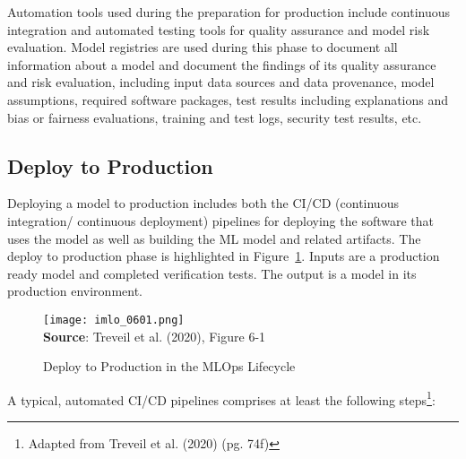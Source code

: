Automation tools used during the preparation for production include continuous integration and automated testing tools for quality assurance and model risk evaluation. Model registries are used during this phase to document all information about a model and document the findings of its quality assurance and risk evaluation, including input data sources and data provenance, model assumptions, required software packages, test results including explanations and bias or fairness evaluations, training and test logs, security test results, etc. 

\subsection{Deploy to Production}

Deploying a model to production includes both the CI/CD (continuous integration/ continuous deployment) pipelines for deploying the software that uses the model as well as building the ML model and related artifacts. The deploy to production phase is highlighted in Figure~\ref{fig:deploytoproduction}. Inputs are a production ready model and completed verification tests. The output is a model in its production environment. 

\begin{figure}[h]
\centering
\texttt{[image: imlo\_0601.png]} \\

\vspace{\baselineskip}
\scriptsize \textbf{Source}: Treveil et al. (2020), Figure 6-1
\caption{Deploy to Production in the MLOps Lifecycle}
\label{fig:deploytoproduction}
\end{figure}

A typical, automated CI/CD pipelines comprises at least the following steps\footnote{Adapted from Treveil et al. (2020) (pg. 74f)}:

